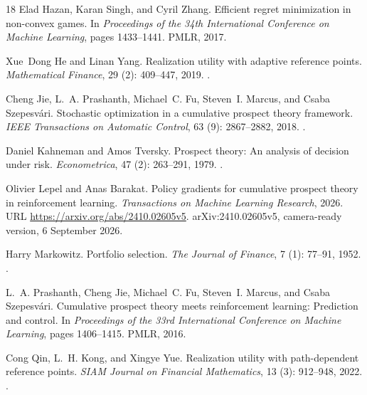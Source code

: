 \documentclass[11pt]{article}
\newcommand{\1}{\mathbf 1}
\begin{document}
\begin{thebibliography}{18}
Elad Hazan, Karan Singh, and Cyril Zhang.
\newblock Efficient regret minimization in non-convex games.
\newblock In \emph{Proceedings of the 34th International Conference on Machine
  Learning}, pages 1433--1441. PMLR, 2017.

Xue~Dong He and Linan Yang.
\newblock Realization utility with adaptive reference points.
\newblock \emph{Mathematical Finance}, 29 (2): 409--447,
  2019.
\newblock {}.

Cheng Jie, L.~A. Prashanth, Michael~C. Fu, Steven~I. Marcus, and Csaba
  Szepesv{\'a}ri.
\newblock Stochastic optimization in a cumulative prospect theory framework.
\newblock \emph{IEEE Transactions on Automatic Control}, 63
  (9): 2867--2882, 2018.
\newblock {}.

Daniel Kahneman and Amos Tversky.
\newblock Prospect theory: An analysis of decision under risk.
\newblock \emph{Econometrica}, 47 (2): 263--291, 1979.
\newblock {}.

Olivier Lepel and Anas Barakat.
\newblock Policy gradients for cumulative prospect theory in reinforcement
  learning.
\newblock \emph{Transactions on Machine Learning Research}, 2026.
\newblock URL \url{https://arxiv.org/abs/2410.02605v5}.
\newblock arXiv:2410.02605v5, camera-ready version, 6 September 2026.

Harry Markowitz.
\newblock Portfolio selection.
\newblock \emph{The Journal of Finance}, 7 (1): 77--91, 1952.
\newblock {}.

L.~A. Prashanth, Cheng Jie, Michael~C. Fu, Steven~I. Marcus, and Csaba
  Szepesv{\'a}ri.
\newblock Cumulative prospect theory meets reinforcement learning: Prediction
  and control.
\newblock In \emph{Proceedings of the 33rd International Conference on Machine
  Learning}, pages 1406--1415. PMLR, 2016.

Cong Qin, L.~H. Kong, and Xingye Yue.
\newblock Realization utility with path-dependent reference points.
\newblock \emph{SIAM Journal on Financial Mathematics}, 13
  (3): 912--948, 2022.
\newblock {}.


\end{thebibliography}
\end{document}
